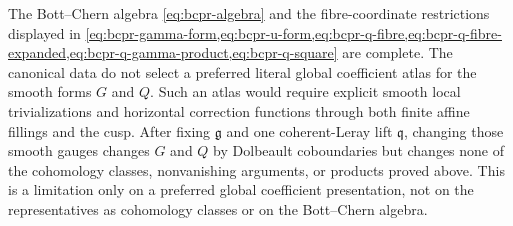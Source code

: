 \begin{remark}
\label{rem:bcpr-global-gauge-boundary}
The Bott--Chern algebra \cref{eq:bcpr-algebra} and the fibre-coordinate
restrictions displayed in
\cref{eq:bcpr-gamma-form,eq:bcpr-u-form,eq:bcpr-q-fibre,eq:bcpr-q-fibre-expanded,eq:bcpr-q-gamma-product,eq:bcpr-q-square}
are complete.  The canonical data do not select a preferred literal global
coefficient atlas for the smooth forms $G$ and $Q$.  Such an atlas would
require explicit smooth local trivializations and horizontal correction
functions through both finite affine fillings and the cusp.  After fixing
$\mathfrak g$ and one coherent-Leray lift $\mathfrak q$, changing those
smooth gauges changes $G$ and $Q$ by Dolbeault coboundaries but changes
none of the cohomology classes, nonvanishing arguments, or products proved
above.  This is a limitation only on a preferred global coefficient
presentation, not on the representatives as cohomology classes or on the
Bott--Chern algebra.
\end{remark}

